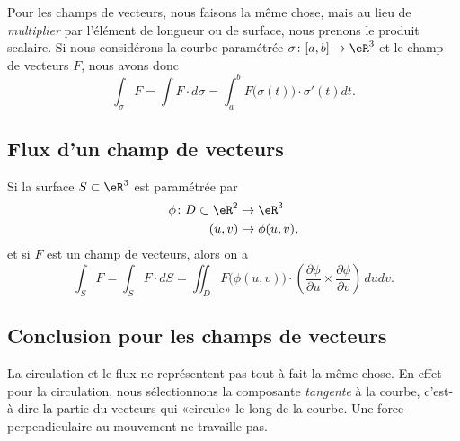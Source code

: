 Pour les champs de vecteurs, nous faisons la même chose, mais au lieu de \emph{multiplier} par l'élément de longueur ou de surface, nous prenons le produit scalaire. Si nous considérons la courbe paramétrée \( \sigma\colon \mathopen[ a , b \mathclose]\to \eR^3\) et le champ de vecteurs \( F\), nous avons donc
\begin{equation}
	\int_{\sigma}F=\int F\cdot d\sigma=\int_a^bF\big( \sigma(t) \big)\cdot\sigma'(t)dt.
\end{equation}

\subsection{Flux d'un champ de vecteurs}

Si la surface \( S\subset\eR^3\) est paramétrée par
\begin{equation}
	\begin{aligned}
		\phi\colon D\subset\eR^2 & \to \eR^3          \\
		(u,v)                    & \mapsto \phi(u,v),
	\end{aligned}
\end{equation}
et si \( F\) est un champ de vecteurs, alors on a
\begin{equation}        \label{EqResIntFluxPhi}
	\int_SF=\int_S F\cdot dS=\iint_D F\big( \phi(u,v) \big)\cdot\left( \frac{ \partial \phi }{ \partial u }\times\frac{ \partial \phi }{ \partial v } \right)\,dudv.
\end{equation}

\subsection{Conclusion pour les champs de vecteurs}

La circulation et le flux ne représentent pas tout à fait la même chose. En effet pour la circulation, nous sélectionnons la composante \emph{tangente} à la courbe, c'est-à-dire la partie du vecteurs qui «circule» le long de la courbe. Une force perpendiculaire au mouvement ne travaille pas.

